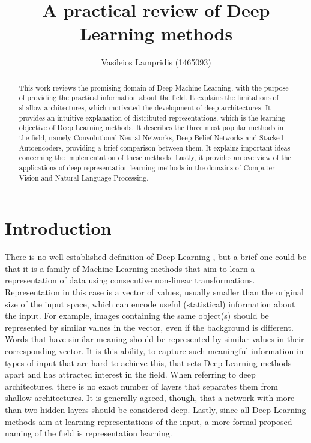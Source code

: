\documentclass[a4paper]{article}
\author{Vasileios Lampridis	(1465093)}
\title{A practical review of Deep Learning methods}
\begin{document}
	
\tableofcontents
\newpage

\maketitle
\listoftodos
\begin{abstract}
	This work reviews the promising domain of Deep Machine Learning, with the purpose of providing the practical information about the field. It explains the limitations of shallow architectures, which motivated the development of deep architectures. It provides an intuitive explanation of distributed representations, which is the learning objective of Deep Learning methods. It  describes the three most popular methods in the field, namely Convolutional Neural Networks, Deep Belief Networks and Stacked Autoencoders, providing a brief comparison between them. It explains important ideas concerning the implementation of these methods. Lastly, it provides an overview of the applications of deep representation learning methods in the domains of Computer Vision and Natural Language Processing.
\end{abstract}

\section{Introduction}
	There is no well-established definition of Deep Learning , but a brief one could be that it is a family of Machine Learning methods that aim to learn a representation of data using consecutive non-linear transformations. Representation in this case is a vector of values, usually smaller than the original size of the input space, which can encode useful (statistical) information about the input. For example, images containing the same object(s) should be represented by similar values in the vector, even if the background is different. Words that have similar meaning should be represented by similar values in their corresponding vector. It is this ability, to capture such meaningful information in types of input that are hard to achieve this, that sets Deep Learning methods apart and has attracted interest in the field.	When referring to deep architectures, there is no exact number of layers that separates them from shallow architectures. It is generally agreed, though, that a network with more than two hidden layers should be considered deep. Lastly, since all Deep Learning methods aim at learning representations of the input, a more formal proposed naming of the field is representation learning.
	
\end{document}
